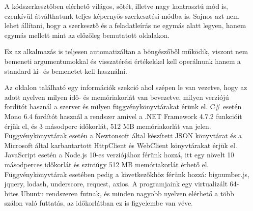 A kódszerkesztőben elérhető világos, sötét, illetve nagy kontrasztú mód is, ezenkívül átválthatunk teljes képernyős szerkesztési módba is. Sajnos azt nem lehet állítani, hogy a szerkesztő és a feladatleírás ne egymás alatt legyen, hanem egymás mellett mint az előzőleg bemutatott oldalakon.

Ez az alkalmazás is teljesen automatizáltan a böngészőből működik, viszont nem bemeneti argumentumokkal és visszatérési értékekkel kell operálnunk hanem a standard ki- és bemenetet kell használni.

Az oldalon található egy információk szekció ahol szépen le van vezetve, hogy az adott nyelven milyen idő- és memóriakorlát van bevezetve, milyen verziójú fordítót használ a szerver és milyen függvénykönyvtárakat érünk el. C\# esetén Mono 6.4 fordítót használ a rendszer amivel a .NET Framework 4.7.2 funkcióit érjük el, és 3 másodperc időkorlát, 512 MB memóriakorlát van jelen. Függvénykönyvtárak esetén a Newtonsoft által készített JSON könyvtárat és a Microsoft által karbantartott HttpClient és WebClient könyvtárakat érjük el. JavaScript esetén a Node.js 10-es verziójához férünk hozzá, itt egy növelt 10 másodperces időkorlát és szintúgy 512 MB memóriakorlát érhető el. Függvénykönyvtárak esetében pedig a következőkhöz férünk hozzá: bignumber.js, jquery, lodash, underscore, request, axios. A programjaink egy virtualizált 64-bites Ubuntu rendszeren futnak, és minden nagyobb nyelven elérhető a több szálon való futtatás, az időkorlátban ez is figyelembe van véve. \cite{hackerrank_environment}

